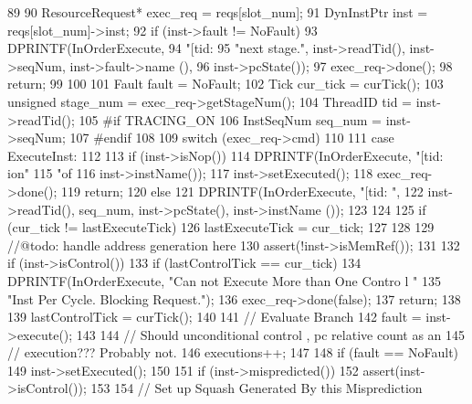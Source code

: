 \begin{DoxyCode}
89 {
90     ResourceRequest* exec_req = reqs[slot_num];
91     DynInstPtr inst = reqs[slot_num]->inst;
92     if (inst->fault != NoFault) {
93         DPRINTF(InOrderExecute,
94                 "[tid:%
95                 "next stage.\n", inst->readTid(), inst->seqNum, inst->fault->name
      (),
96                 inst->pcState());
97         exec_req->done();
98         return;
99     }
100 
101     Fault fault = NoFault;
102     Tick cur_tick = curTick();
103     unsigned stage_num = exec_req->getStageNum();
104     ThreadID tid = inst->readTid();
105 #if TRACING_ON
106     InstSeqNum seq_num = inst->seqNum;
107 #endif
108 
109     switch (exec_req->cmd)
110     {
111       case ExecuteInst:
112         {
113             if (inst->isNop()) {
114                 DPRINTF(InOrderExecute, "[tid:%
      ion"
115                         "of %
116                         inst->instName());
117                 inst->setExecuted();
118                 exec_req->done();
119                 return;
120             } else {
121                 DPRINTF(InOrderExecute, "[tid:%
      ",
122                         inst->readTid(), seq_num, inst->pcState(), inst->instName
      ());
123             }
124 
125             if (cur_tick != lastExecuteTick) {
126                 lastExecuteTick = cur_tick;
127             }
128 
129             //@todo: handle address generation here
130             assert(!inst->isMemRef());
131 
132             if (inst->isControl()) {
133                 if (lastControlTick == cur_tick) {
134                     DPRINTF(InOrderExecute, "Can not Execute More than One Contro
      l "
135                             "Inst Per Cycle. Blocking Request.\n");
136                     exec_req->done(false);
137                     return;
138                 }
139                 lastControlTick = curTick();
140 
141                 // Evaluate Branch
142                 fault = inst->execute();
143 
144                 // Should unconditional control , pc relative count as an
145                 // execution??? Probably not.
146                 executions++;
147 
148                 if (fault == NoFault) {
149                     inst->setExecuted();
150 
151                     if (inst->mispredicted()) {
152                         assert(inst->isControl());
153 
154                         // Set up Squash Generated By this Misprediction
}}}}}}
\end{DoxyCode}
